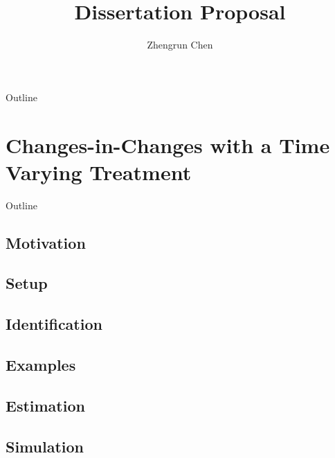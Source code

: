 \documentclass[aspectratio=1610, 9pt]{beamer}
\title[Chen 2025]{Dissertation Proposal}
\author{Zhengrun Chen}
\begin{document}
\maketitle

\begin{frame}{Outline}
    \tableofcontents
\end{frame}


\section{Changes-in-Changes with a Time Varying Treatment}

\begin{frame}{Outline}
    \tableofcontents[sectionstyle=show/shaded]
\end{frame}

\subsection*{Motivation}
\subsection*{Setup}
\subsection*{Identification}
\subsection*{Examples}
\subsection*{Estimation}
\subsection*{Simulation}
\end{document}
